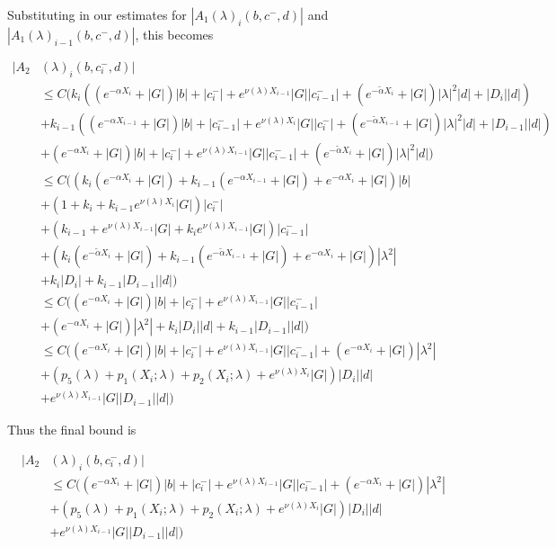 \documentclass[12pt]{article}
\begin{document}
\begin{enumerate}
Substituting in our estimates for $|A_1(\lambda)_i(b, c^-, d)|$ and $|A_1(\lambda)_{i-1}(b, c^-, d)|$, this becomes

\begin{align*}
|A_2&(\lambda)_i(b, c_i^-, d)| \\
&\leq C \Big( k_i ( (e^{-\alpha X_i} + |G|) |b| 
+ |c_i^-| + e^{\nu(\lambda)X_{i-1}} |G||c_{i-1}^-| + (e^{-\tilde{\alpha} X_i} + |G|) |\lambda|^2 |d| + |D_i||d| ) \\
&+ k_{i-1} ( (e^{-\alpha X_{i-1}} + |G|) |b| 
+ |c_{i-1}^-| + e^{\nu(\lambda)X_i} |G||c_i^-| + (e^{-\tilde{\alpha} X_{i-1}} + |G|) |\lambda|^2 |d| + |D_{i-1}||d| )  \\
&+ (e^{-\alpha X_i} + |G|) |b| + |c_i^-| + e^{\nu(\lambda)X_{i-1}} |G||c_{i-1}^-| 
+ (e^{-\tilde{\alpha} X_i} + |G|) |\lambda|^2 |d| \Big)\\
&\leq C \Big( ( k_i (e^{-\alpha X_i} + |G|) + k_{i-1} (e^{-\alpha X_{i-1}} + |G|) + e^{-\alpha X_i} + |G| ) |b|\\
&+ (1 + k_i + k_{i-1} e^{\nu(\lambda)X_i}|G|)|c_i^-| \\
&+ (k_{i-1} + e^{\nu(\lambda)X_{i-1}} |G| + k_i e^{\nu(\lambda)X_{i-1}} |G|)|c_{i-1}^-| \\
&+ ( k_i (e^{-\tilde{\alpha} X_i} + |G|) + k_{i-1} (e^{-\tilde{\alpha}X_{i-1}} + |G|) + e^{-\alpha X_i} + |G| ) |\lambda^2| \\
&+ k_i |D_i| + k_{i-1} |D_{i-1}||d| \Big) \\
&\leq C \Big( ( e^{-\alpha X_i} + |G| ) |b| + |c_i^-| + e^{\nu(\lambda)X_{i-1}} |G| |c_{i-1}^-| \\
&+ (e^{-\alpha X_i} + |G| ) |\lambda^2| + k_i |D_i||d| + k_{i-1} |D_{i-1}||d| \Big) \\
&\leq C \Big( ( e^{-\alpha X_i} + |G| ) |b| + |c_i^-| + e^{\nu(\lambda)X_{i-1}} |G| |c_{i-1}^-| + (e^{-\alpha X_i} + |G| ) |\lambda^2| \\
&+ (p_5(\lambda) + p_1(X_i; \lambda) + p_2(X_i; \lambda) + e^{\nu(\lambda)X_i} |G|)|D_i| |d| \\
&+ e^{\nu(\lambda)X_{i-1}} |G| |D_{i-1}||d| \Big)
\end{align*}

Thus the final bound is

\begin{align*}
|A_2&(\lambda)_i(b, c_i^-, d)| \\
&\leq C \Big( ( e^{-\alpha X_i} + |G| ) |b| + |c_i^-| + e^{\nu(\lambda)X_{i-1}} |G| |c_{i-1}^-| + (e^{-\alpha X_i} + |G| ) |\lambda^2| \\
&+ (p_5(\lambda) + p_1(X_i; \lambda) + p_2(X_i; \lambda) + e^{\nu(\lambda)X_i} |G|)|D_i| |d| \\
&+ e^{\nu(\lambda)X_{i-1}} |G| |D_{i-1}||d| \Big)
\end{align*}


\end{enumerate}
\end{document}

